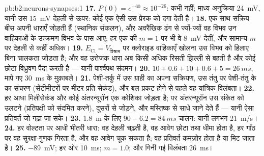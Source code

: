 \begin{solution}{pb:b2:neurons-synapses:1}
\textbf{17.} $P(0) = e^{-60} \approx 10^{-26}$: कभी नहीं; माध्य अनुक्रिया
\qty{24}{mV}, यानी उस \qty{15}{mV} देहली से ऊपर: कोई एक ऐसी 
उस प्रेरक  को दगा देती है।
\textbf{18.} एक साथ सक्रिय बीस  अपनी धाराएँ जोड़ती हैं
(स्थानिक संकलन), और अवरैखिक ढंग से ज्यों-ज्यों वह विभव उन वाहिकाओं के
उत्क्रमण विभव के पास आए; हर एक की $m = 1$ पर भी वे
\qty{8}{mV} देतीं, और सामान्य $m$ पर देहली से कहीं अधिक।
\textbf{19.} $E_{\mathrm{Cl}} = V_{\text{विश्राम}}$ पर क्लोराइड वाहिकाएँ खोलना
उस विभव को हिलाए बिना चालकता जोड़ता है; और वह उत्तेजक
धारा अब किसी अधिक रिसती झिल्ली से बहती है और कोई छोटा
विध्रुवण पैदा करती है --- यानी पार्श्वपथ संदमन।
\textbf{20.} $10 + 0.6 + 10 + 0.6 + 5 = \qty{26}{ms}$, मापे गए
\qty{30}{ms} के मुक़ाबले।
\textbf{21.} पेशी-तर्कु में उस ग्राही का अपना सक्रियण, उस तंतु पर
पेशी-तंतु के  का संचरण
(सेंटीमीटरों पर मीटर प्रति सेकंड), और बल प्रकट होने से पहले
वह यांत्रिक विलंबता।
\textbf{22.} हर  आधा मिलीसेकंड और कोई अंतरन्यूरॉन एक कोशिका
जोड़ता है; पर अंतरन्यूरॉन उस संकेत को उलटने
(प्रतिपक्षी को संदमित करने), दूसरों से जोड़ने, और
मस्तिष्क से साधे जाने देते हैं --- यानी ऐसा प्रतिवर्त जो गढ़ा जा सके।
\textbf{23.} \qty{1.8}{m} के लिए $90 - 6.2 = \qty{84}{ms}$ चालन:
यानी लगभग \qty{21}{m/s}।
\textbf{24.} हर वोल्टता पर आधी भीतरी धारा: वह देहली
चढ़ती है, वह आवेग छोटा तथा धीमा होता है, हर गाँठ पर वह सुरक्षा-गुणक
गिरता है, और वह आवेग चूक सकता है; वह प्रतिवर्त कमज़ोर होता है या
मिट जाता है।
\textbf{25.}  \qty{-89}{mV}; हर ओर \qty{10}{ms};
$m = 1.0$; और गिनी गई विलंबता \qty{26}{ms}।
\end{solution}
